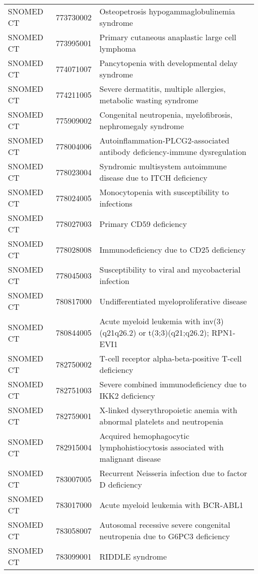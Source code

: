 \begin{table}[ht]
\begin{tabular}{lll}
  SNOMED CT & 773730002 & Osteopetrosis hypogammaglobulinemia syndrome \\ 
  SNOMED CT & 773995001 & Primary cutaneous anaplastic large cell lymphoma \\ 
  SNOMED CT & 774071007 & Pancytopenia with developmental delay syndrome \\ 
  SNOMED CT & 774211005 & Severe dermatitis, multiple allergies, metabolic wasting syndrome \\ 
  SNOMED CT & 775909002 & Congenital neutropenia, myelofibrosis, nephromegaly syndrome \\ 
  SNOMED CT & 778004006 & Autoinflammation-PLCG2-associated antibody deficiency-immune dysregulation \\ 
  SNOMED CT & 778023004 & Syndromic multisystem autoimmune disease due to ITCH deficiency \\ 
  SNOMED CT & 778024005 & Monocytopenia with susceptibility to infections \\ 
  SNOMED CT & 778027003 & Primary CD59 deficiency \\ 
  SNOMED CT & 778028008 & Immunodeficiency due to CD25 deficiency \\ 
  SNOMED CT & 778045003 & Susceptibility to viral and mycobacterial infection \\ 
  SNOMED CT & 780817000 & Undifferentiated myeloproliferative disease \\ 
  SNOMED CT & 780844005 & Acute myeloid leukemia with inv(3)(q21q26.2) or t(3;3)(q21;q26.2); RPN1-EVI1 \\ 
  SNOMED CT & 782750002 & T-cell receptor alpha-beta-positive T-cell deficiency \\ 
  SNOMED CT & 782751003 & Severe combined immunodeficiency due to IKK2 deficiency \\ 
  SNOMED CT & 782759001 & X-linked dyserythropoietic anemia with abnormal platelets and neutropenia \\ 
  SNOMED CT & 782915004 & Acquired hemophagocytic lymphohistiocytosis associated with malignant disease \\ 
  SNOMED CT & 783007005 & Recurrent Neisseria infection due to factor D deficiency \\ 
  SNOMED CT & 783017000 & Acute myeloid leukemia with BCR-ABL1 \\ 
  SNOMED CT & 783058007 & Autosomal recessive severe congenital neutropenia due to G6PC3 deficiency \\ 
  SNOMED CT & 783099001 & RIDDLE syndrome \\ 

\end{tabular}
\end{table}
